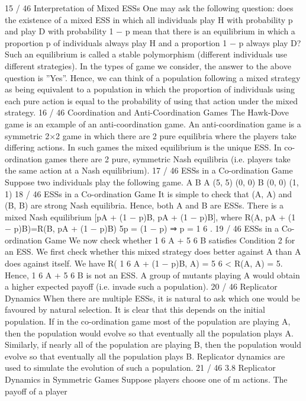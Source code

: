 \documentclass[]{report}
\begin{document}
15 / 46
Interpretation of Mixed ESSs
One may ask the following question: does the existence of a mixed
ESS in which all individuals play H with probability p and play D
with probability 1 − p mean that there is an equilibrium in which a
proportion p of individuals always play H and a proportion 1 − p
always play D?
Such an equilibrium is called a stable polymorphism (different
individuals use different strategies).
In the types of game we consider, the answer to the above
question is ”Yes”. Hence, we can think of a population following a
mixed strategy as being equivalent to a population in which the
proportion of individuals using each pure action is equal to the
probability of using that action under the mixed strategy.
16 / 46
Coordination and Anti-Coordination Games
The Hawk-Dove game is an example of an anti-coordination game.
An anti-coordination game is a symmetric 2×2 game in which
there are 2 pure equilibria where the players take differing actions.
In such games the mixed equilibrium is the unique ESS.
In co-ordination games there are 2 pure, symmetric Nash equilibria
(i.e. players take the same action at a Nash equilibrium).
17 / 46
ESSs in a Co-ordination Game
Suppose two individuals play the following game.
A B
A (5, 5) (0, 0)
B (0, 0) (1, 1)
18 / 46
ESSs in a Co-ordination Game
It is simple to check that (A, A) and (B, B) are strong Nash
equilibria.
Hence, both A and B are ESSs.
There is a mixed Nash equilibrium [pA + (1 − p)B, pA + (1 − p)B],
where
R(A, pA + (1 − p)B)=R(B, pA + (1 − p)B)
5p = (1 − p) ⇒ p =
1
6
.
19 / 46
ESSs in a Co-ordination Game
We now check whether 1
6
A +
5
6
B satisfies Condition 2 for an ESS.
We first check whether this mixed strategy does better against A
than A does against itself. We have
R(
1
6
A + (1 − p)B, A) = 5
6
< R(A, A) = 5.
Hence, 1
6
A +
5
6
B is not an ESS. A group of mutants playing A
would obtain a higher expected payoff (i.e. invade such a
population).
20 / 46
Replicator Dynamics
When there are multiple ESSs, it is natural to ask which one would
be favoured by natural selection.
It is clear that this depends on the initial population. If in the
co-ordination game most of the population are playing A, then the
population would evolve so that eventually all the population plays
A.
Similarly, if nearly all of the population are playing B, then the
population would evolve so that eventually all the population plays
B.
Replicator dynamics are used to simulate the evolution of such a
population.
21 / 46
3.8 Replicator Dynamics in Symmetric Games
Suppose players choose one of m actions. The payoff of a player
\end{document}

